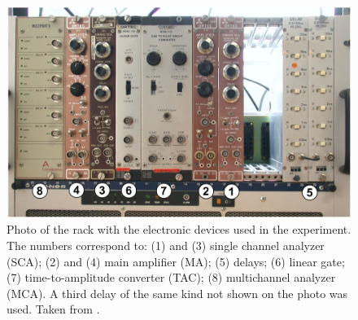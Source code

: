 \begin{figure}[H]
    \centering
    \includegraphics[width=0.8\linewidth]{figures/rack_anleitung.jpg}
    \caption{
        Photo of the rack with the electronic devices used in the experiment.
        The numbers correspond to: 
        (1) and (3) single channel analyzer (SCA);
        (2) and (4) main amplifier (MA);
        (5) delays;
        (6) linear gate;
        (7) time-to-amplitude converter (TAC);
        (8) multichannel analyzer (MCA).
        A third delay of the same kind not shown on the photo was used. 
        Taken from \cite{ver}.
        }
    \label{fig:rack}
\end{figure}



\FloatBarrier
